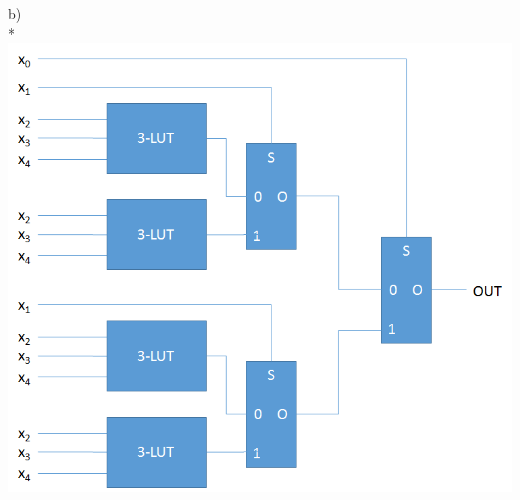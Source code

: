 \documentclass[11pt]{article}
\begin{document}
b)\\*
\includegraphics[width=\linewidth]{q1_lut.png}\\\\
\end{document}
